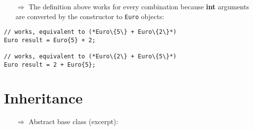 \documentclass[10pt]{book}
\begin{document}
\begin{enumerate}
\item[$\Rightarrow$] The definition above works for every combination because \textbf{int} arguments are converted by the constructor to \texttt{Euro} objects:
\end{enumerate}
\begin{lstlisting}
// works, equivalent to (*Euro\{5\} + Euro\{2\}*)
Euro result = Euro{5} + 2; 

// works, equivalent to (*Euro\{2\} + Euro\{5\}*)
Euro result = 2 + Euro{5}; 
\end{lstlisting}
%
%
\section{Inheritance}
\begin{enumerate}
\item[$\Rightarrow$] Abstract base class (excerpt):
\end{enumerate}
\end{document}
